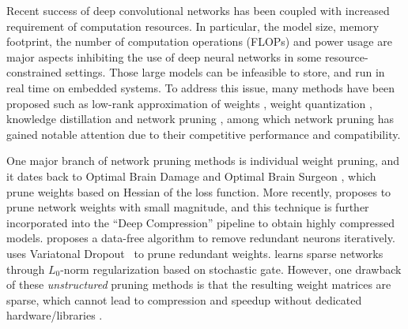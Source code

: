 Recent success of deep convolutional networks \citep{lecun1998gradient, imagenet,rcnn,fcn,resnet,maskrcnn} has been coupled with increased requirement of computation resources. In particular, the model size, memory footprint, the number of computation operations (FLOPs) and power usage are major aspects inhibiting the use of deep neural networks in some resource-constrained settings. Those large models can be infeasible to store, and run in real time on embedded systems. To address this issue, many methods have been proposed such as low-rank approximation of weights \citep{lowrank1, lowrank2}, weight quantization \citep{binarynet, xnornet}, knowledge distillation \citep{kd, fitnet} and network pruning \citep{han2015learning,li2016pruning}, among which network pruning has gained notable attention due to their competitive performance and compatibility.

One major branch of network pruning methods is individual weight pruning, and it dates back to Optimal Brain Damage \citep{obd} and Optimal Brain Surgeon \citep{obs}, which prune weights based on Hessian of the loss function. More recently, \cite{han2015learning} proposes to prune network weights with small magnitude, and this technique is further incorporated into the ``Deep Compression'' pipeline \citep{han2015deep} to obtain highly compressed models. \cite{datafree} proposes a data-free algorithm to remove redundant neurons iteratively.  \citet{vdropout} uses  Variatonal Dropout~\citep{vdropoutorg} to prune redundant weights. \citet{l0sparse} learns sparse networks through $L_0$-norm regularization based on stochastic gate. 
However, one drawback of these \emph{unstructured} pruning methods is that the resulting weight matrices are sparse, which cannot lead to compression and speedup without dedicated hardware/libraries \citep{han2016eie}. 

